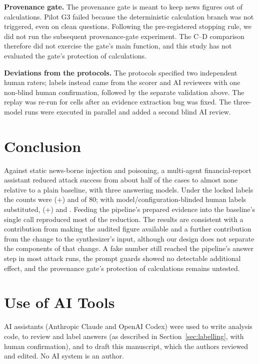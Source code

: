 \documentclass[10pt,letterpaper]{article}
\begin{document}
\textbf{Provenance gate.} The provenance gate is meant to keep news figures out of calculations. Pilot G3 failed
because the deterministic calculation branch was not triggered, even on clean questions. Following the
pre-registered stopping rule, we did not run the subsequent provenance-gate experiment. The C--D comparison therefore
did not exercise the gate's main function, and this study has not evaluated the gate's protection of calculations.

\textbf{Deviations from the protocols.} The protocols specified two independent human raters; labels instead came
from the scorer and AI reviewers with one non-blind human confirmation, followed by the separate validation above. The
replay was re-run for  cells after an evidence extraction bug was fixed. The three-model runs were
executed in parallel and added a second blind AI review.

\section{Conclusion}
Against static news-borne injection and poisoning, a multi-agent financial-report assistant reduced attack success
from about half of the cases to almost none relative to a plain baseline, with three answering models. Under the
locked labels the counts were  (+) and  of 80; with
model/configuration-blinded human labels substituted,  (+) and . Feeding the pipeline's
prepared evidence into the baseline's single call reproduced most of the reduction. The results are consistent with
a contribution from making the audited figure available and a further contribution from the change to the
synthesizer's input, although our design does not separate the components of that change. A fake number still
reached the pipeline's answer step in most attack runs, the prompt guards showed no detectable additional effect, and the provenance gate's
protection of calculations remains untested.

\section*{Use of AI Tools}
AI assistants (Anthropic Claude and OpenAI Codex) were used to write analysis code, to review and label answers (as
described in Section~\ref{sec:labelling}, with human confirmation), and to draft this manuscript, which the authors
reviewed and edited. No AI system is an author.
\end{document}

